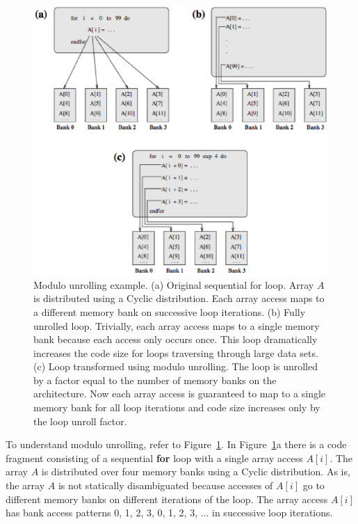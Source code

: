 \begin{figure}
\begin{center}
\includegraphics[width=\linewidth]{./Figures/modulo_unrolling.eps}
\caption{Modulo unrolling example. (a) Original sequential for loop. Array $A$ is distributed using a Cyclic distribution. Each array access maps to a different memory bank on successive loop iterations. (b) Fully unrolled loop. Trivially, each array access maps to a single memory bank because each access only occurs once. This loop dramatically increases the code size for loops traversing through large data sets. (c) Loop transformed using modulo unrolling. The loop is unrolled by a factor equal to the number of memory banks on the architecture. Now each array access is guaranteed to map to a single memory bank for all loop iterations and code size increases only by the loop unroll factor.}
\label{modulo_unrolling}
\end{center}
\end{figure}

To understand modulo unrolling, refer to Figure~\ref{modulo_unrolling}. In Figure~\ref{modulo_unrolling}a there is a code fragment consisting of a sequential \textbf{for} loop with a single array access $A[i]$. The array $A$ is distributed over four memory banks using a Cyclic distribution. As is, the array $A$ is not statically disambiguated because accesses of $A[i]$ go to different memory banks on different iterations of the loop. The array access $A[i]$ has bank access patterns 0, 1, 2, 3, 0, 1, 2, 3, ... in successive loop iterations. 

